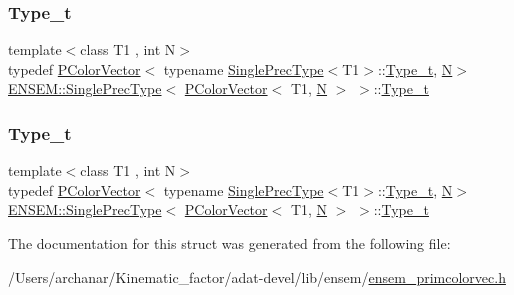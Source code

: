 \subsubsection{\texorpdfstring{Type\_t}{Type\_t}\hspace{0.1cm}{\footnotesize\ttfamily [2/3]}}
{\footnotesize\ttfamily template$<$class T1 , int N$>$ \\
typedef \mbox{\hyperlink{classENSEM_1_1PColorVector}{P\+Color\+Vector}}$<$ typename \mbox{\hyperlink{structENSEM_1_1SinglePrecType}{Single\+Prec\+Type}}$<$T1$>$\+::\mbox{\hyperlink{structENSEM_1_1SinglePrecType_3_01PColorVector_3_01T1_00_01N_01_4_01_4_adbaedd406be0507c332f7676ad81053d}{Type\+\_\+t}}, \mbox{\hyperlink{adat__devel_2lib_2hadron_2operator__name__util_8cc_a7722c8ecbb62d99aee7ce68b1752f337}{N}}$>$ \mbox{\hyperlink{structENSEM_1_1SinglePrecType}{E\+N\+S\+E\+M\+::\+Single\+Prec\+Type}}$<$ \mbox{\hyperlink{classENSEM_1_1PColorVector}{P\+Color\+Vector}}$<$ T1, \mbox{\hyperlink{adat__devel_2lib_2hadron_2operator__name__util_8cc_a7722c8ecbb62d99aee7ce68b1752f337}{N}} $>$ $>$\+::\mbox{\hyperlink{structENSEM_1_1SinglePrecType_3_01PColorVector_3_01T1_00_01N_01_4_01_4_adbaedd406be0507c332f7676ad81053d}{Type\+\_\+t}}}

\mbox{\label{structENSEM_1_1SinglePrecType_3_01PColorVector_3_01T1_00_01N_01_4_01_4_adbaedd406be0507c332f7676ad81053d}} 
\subsubsection{\texorpdfstring{Type\_t}{Type\_t}\hspace{0.1cm}{\footnotesize\ttfamily [3/3]}}
{\footnotesize\ttfamily template$<$class T1 , int N$>$ \\
typedef \mbox{\hyperlink{classENSEM_1_1PColorVector}{P\+Color\+Vector}}$<$ typename \mbox{\hyperlink{structENSEM_1_1SinglePrecType}{Single\+Prec\+Type}}$<$T1$>$\+::\mbox{\hyperlink{structENSEM_1_1SinglePrecType_3_01PColorVector_3_01T1_00_01N_01_4_01_4_adbaedd406be0507c332f7676ad81053d}{Type\+\_\+t}}, \mbox{\hyperlink{adat__devel_2lib_2hadron_2operator__name__util_8cc_a7722c8ecbb62d99aee7ce68b1752f337}{N}}$>$ \mbox{\hyperlink{structENSEM_1_1SinglePrecType}{E\+N\+S\+E\+M\+::\+Single\+Prec\+Type}}$<$ \mbox{\hyperlink{classENSEM_1_1PColorVector}{P\+Color\+Vector}}$<$ T1, \mbox{\hyperlink{adat__devel_2lib_2hadron_2operator__name__util_8cc_a7722c8ecbb62d99aee7ce68b1752f337}{N}} $>$ $>$\+::\mbox{\hyperlink{structENSEM_1_1SinglePrecType_3_01PColorVector_3_01T1_00_01N_01_4_01_4_adbaedd406be0507c332f7676ad81053d}{Type\+\_\+t}}}



The documentation for this struct was generated from the following file\+:\begin{DoxyCompactItemize}
\item 
/\+Users/archanar/\+Kinematic\+\_\+factor/adat-\/devel/lib/ensem/\mbox{\hyperlink{adat-devel_2lib_2ensem_2ensem__primcolorvec_8h}{ensem\+\_\+primcolorvec.\+h}}\end{DoxyCompactItemize}
